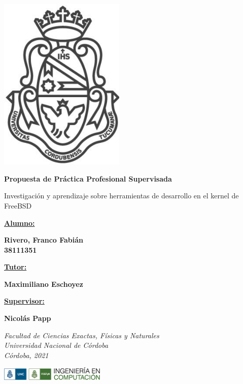 \begin{titlepage}
	\begin{center}
		\includegraphics[width=6cm]{recursos/logo_UNC}
		\vspace{0.2cm}
		
		\Huge
		\textbf{Propuesta de Práctica Profesional Supervisada}
			
		\vspace{0.5cm}
		\LARGE
		Investigación y aprendizaje sobre herramientas de desarrollo en el kernel de FreeBSD
			
		\vspace{0.5cm}
		\large
		\underline{\textbf{Alumno:}}
			
		\textbf{Rivero, Franco Fabián \\38111351}
		\vspace{0.2cm}
			
		\underline{\textbf{Tutor:}}
			
		\textbf{Maximiliano Eschoyez}
			
		\vspace{0.2cm}
			
		\underline{\textbf{Supervisor:}}
			
		\textbf{Nicolás Papp}
		\vspace{0.5cm}
			
		\textit{Facultad de Ciencias Exactas, Físicas y Naturales}\\
		\textit{Universidad Nacional de Córdoba}\\
		\textit{Córdoba, 2021}
			
		\vspace{1cm}
			
		\includegraphics[width=5cm]{recursos/logo}
	\end{center}  
\end{titlepage}